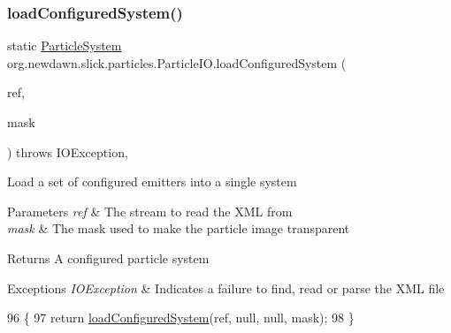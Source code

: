 \subsubsection{\texorpdfstring{load\+Configured\+System()}{loadConfiguredSystem()}\hspace{0.1cm}{\footnotesize\ttfamily [4/9]}}
{\footnotesize\ttfamily static \mbox{\hyperlink{classorg_1_1newdawn_1_1slick_1_1particles_1_1_particle_system}{Particle\+System}} org.\+newdawn.\+slick.\+particles.\+Particle\+I\+O.\+load\+Configured\+System (\begin{DoxyParamCaption}\item[{Input\+Stream}]{ref,  }\item[{\mbox{\hyperlink{classorg_1_1newdawn_1_1slick_1_1_color}{Color}}}]{mask }\end{DoxyParamCaption}) throws I\+O\+Exception\hspace{0.3cm}{\ttfamily [inline]}, {\ttfamily [static]}}

Load a set of configured emitters into a single system


\begin{DoxyParams}{Parameters}
{\em ref} & The stream to read the X\+ML from \\
\hline
{\em mask} & The mask used to make the particle image transparent \\
\hline
\end{DoxyParams}
\begin{DoxyReturn}{Returns}
A configured particle system 
\end{DoxyReturn}

\begin{DoxyExceptions}{Exceptions}
{\em I\+O\+Exception} & Indicates a failure to find, read or parse the X\+ML file \\
\hline
\end{DoxyExceptions}

\begin{DoxyCode}
96                                \{
97       \textcolor{keywordflow}{return} \mbox{\hyperlink{classorg_1_1newdawn_1_1slick_1_1particles_1_1_particle_i_o_a1da2bcc8784c9cf967326954bc3c9d33}{loadConfiguredSystem}}(ref, null, null, mask);
98     \}
\end{DoxyCode}
\mbox{\label{classorg_1_1newdawn_1_1slick_1_1particles_1_1_particle_i_o_a6eb42d2a3b7f681198540854d6013a46}} 
